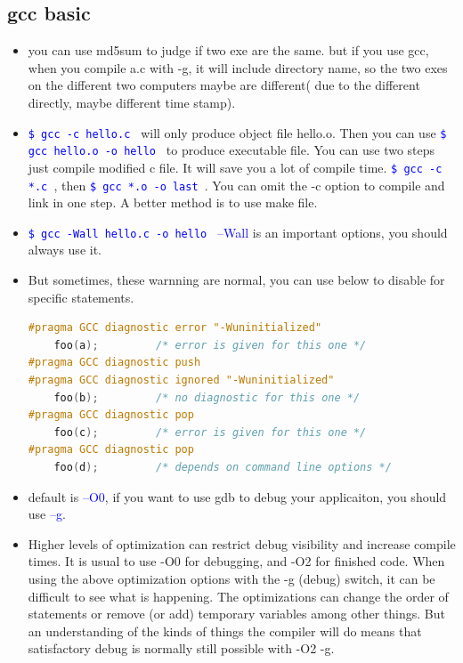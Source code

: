 \documentclass[a4paper,11pt,twoside]{book}
\newcommand{\linuxcommand}[1]{\texttt{\textcolor{blue}{\$ #1 \Pisymbol{psy}{191}}}}
\newcommand{\op}[1]{\textcolor{blue}{-#1}}
\begin{document}
\subsection{gcc basic}
\begin{itemize}
	
   \item you can use md5sum to judge if two exe are the same. but if you use gcc, when you compile a.c with -g, it will include directory name, so the two exes on the different two computers maybe are different( due to the different directly, maybe different time stamp). 

   \item \linuxcommand{gcc -c hello.c} will only produce object file hello.o. Then you can use \linuxcommand{gcc hello.o -o hello} to produce executable file. You can use two steps just compile modified c file. It will save you a lot of compile time. \linuxcommand{gcc -c *.c}, then \linuxcommand{gcc *.o -o last}. You can omit the -c option to compile and link in one step. A better method is to use make file.

   \item \linuxcommand{gcc -Wall hello.c -o hello} \op{-Wall} is an important options, you should always use it.

   \item But sometimes, these warnning are normal, you can use below to disable for specific statements.

\begin{lstlisting}[frame=single, language=c++]
#pragma GCC diagnostic error "-Wuninitialized"
    foo(a);         /* error is given for this one */
#pragma GCC diagnostic push
#pragma GCC diagnostic ignored "-Wuninitialized"
    foo(b);         /* no diagnostic for this one */
#pragma GCC diagnostic pop
    foo(c);         /* error is given for this one */
#pragma GCC diagnostic pop
    foo(d);         /* depends on command line options */
\end{lstlisting}
\item default is \op{-O0}, if you want to use gdb to debug your applicaiton, you should use \op{-g}.

\item Higher levels of optimization can restrict debug visibility and increase compile times. It is usual to use -O0 for debugging, and -O2 for finished code. When using the above optimization options with the -g (debug) switch, it can be difficult to see what is happening. The optimizations can change the order of statements or remove (or add) temporary variables among other things. But an understanding of the kinds of things the compiler will do means that satisfactory debug is normally still possible with -O2 -g.


\end{itemize}
\end{document}
